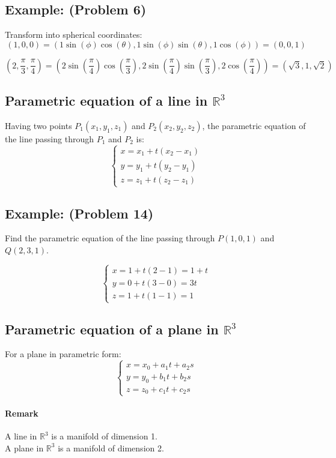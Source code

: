 \documentclass[11pt]{article}
\begin{document}
\subsection*{Example: (Problem 6)}
Transform into spherical coordinates:
\[
(1,0,0) = (1 \sin(\phi) \cos(\theta), 1 \sin(\phi) \sin(\theta), 1 \cos(\phi)) = (0,0,1)
\]

\[
(2,\frac{\pi}{3},\frac{\pi}{4}) = (2 \sin(\frac{\pi}{4}) \cos(\frac{\pi}{3}), 2 \sin(\frac{\pi}{4}) \sin(\frac{\pi}{3}), 2 \cos(\frac{\pi}{4})) = (\sqrt{3}, 1, \sqrt{2})
\]

\subsection{Parametric equation of a line in $\mathbb{R}^3$}
Having two points $P_1(x_1, y_1, z_1)$ and $P_2(x_2, y_2, z_2)$, the parametric equation of the line passing through $P_1$ and $P_2$ is:
\[
\begin{cases}
x = x_1 + t(x_2 - x_1) \\
y = y_1 + t(y_2 - y_1) \\
z = z_1 + t(z_2 - z_1)
\end{cases}
\]

\subsection*{Example: (Problem 14)}
Find the parametric equation of the line passing through $P(1,0,1)$ and $Q(2,3, 1)$.

\[
\begin{cases}
x = 1 + t(2 - 1) = 1 + t \\
y = 0 + t(3 - 0) = 3t \\
z = 1 + t(1 - 1) = 1
\end{cases}
\]

\subsection{Parametric equation of a plane in $\mathbb{R}^3$}
For a plane in parametric form:
\[
\begin{cases}
x = x_0 + a_1 t + a_2 s \\
y = y_0 + b_1 t + b_2 s \\
z = z_0 + c_1 t + c_2 s
\end{cases}
\]

\paragraph{Remark}
A line in $\mathbb{R}^3$ is a manifold of dimension 1. \\
A plane in $\mathbb{R}^3$ is a manifold of dimension 2.
\end{document}
